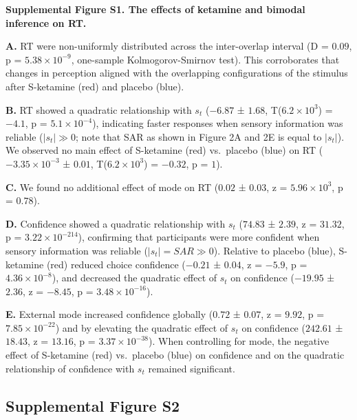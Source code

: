 \documentclass[
]{article}
\begin{document}
\textbf{Supplemental Figure S1. The effects of ketamine and bimodal
inference on RT.}

\textbf{A.} RT were non-uniformly distributed across the inter-overlap
interval (D = \(0.09\), p = \(\ensuremath{5.38\times 10^{-9}}\),
one-sample Kolmogorov-Smirnov test). This corroborates that changes in
perception aligned with the overlapping configurations of the stimulus
after S-ketamine (red) and placebo (blue).

\textbf{B.} RT showed a quadratic relationship with \(s_t\) (\(-6.87\) ±
\(1.68\), T(\(\ensuremath{6.2\times 10^{3}}\)) = \(-4.1\), p =
\(\ensuremath{5.1\times 10^{-4}}\)), indicating faster responses when
sensory information was reliable (\(|s_t| \gg 0\); note that SAR as
shown in Figure 2A and 2E is equal to \(|s_t|\)). We observed no main
effect of S-ketamine (red) vs.~placebo (blue) on RT
(\(\ensuremath{-3.35\times 10^{-3}}\) ± \(0.01\),
T(\(\ensuremath{6.2\times 10^{3}}\)) = \(-0.32\), p = \(1\)).

\textbf{C.} We found no additional effect of mode on RT (\(0.02\) ±
\(0.03\), z = \(\ensuremath{5.96\times 10^{3}}\), p = \(0.78\)).

\textbf{D.} Confidence showed a quadratic relationship with \(s_t\)
(\(74.83\) ± \(2.39\), z = \(31.32\), p =
\(\ensuremath{3.22\times 10^{-214}}\)), confirming that participants
were more confident when sensory information was reliable
(\(|s_t| = SAR \gg 0\)). Relative to placebo (blue), S-ketamine (red)
reduced choice confidence (\(-0.21\) ± \(0.04\), z = \(-5.9\), p =
\(\ensuremath{4.36\times 10^{-8}}\)), and decreased the quadratic effect
of \(s_t\) on confidence (\(-19.95\) ± \(2.36\), z = \(-8.45\), p =
\(\ensuremath{3.48\times 10^{-16}}\)).

\textbf{E.} External mode increased confidence globally (\(0.72\) ±
\(0.07\), z = \(9.92\), p = \(\ensuremath{7.85\times 10^{-22}}\)) and by
elevating the quadratic effect of \(s_t\) on confidence (\(242.61\) ±
\(18.43\), z = \(13.16\), p = \(\ensuremath{3.37\times 10^{-38}}\)).
When controlling for mode, the negative effect of S-ketamine (red)
vs.~placebo (blue) on confidence and on the quadratic relationship of
confidence with \(s_t\) remained significant.

\newpage

\hypertarget{supplemental-figure-s2}{%
\subsection{Supplemental Figure S2}\label{supplemental-figure-s2}}
\end{document}
